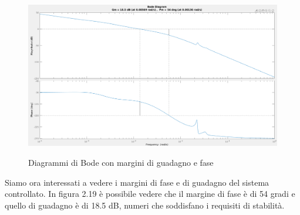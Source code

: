 \documentclass[Lau,noexaminfo]{sapthesis}
\begin{document}
	\begin{figure}[h]
		\centering
		\setlength{\unitlength}{0.27mm}
		\includegraphics[scale=0.3]{margin_P2}\\
		\caption{Diagrammi di Bode con margini di guadagno e fase}
	\end{figure}
	
	Siamo ora interessati a vedere i margini di fase e di guadagno del sistema controllato. In figura 2.19 è possibile vedere che il margine di fase è di 54 gradi e quello di guadagno è di 18.5 dB, numeri che soddisfano i requisiti di stabilità.
	

	
\end{document}
